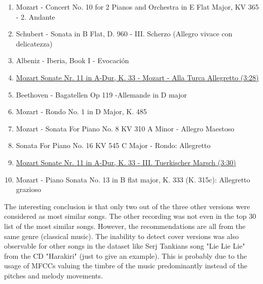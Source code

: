 \begin{enumerate}
	\setlength\itemsep{-0.5em}
	\item Mozart - Concert No. 10 for 2 Pianos and Orchestra in E Flat Major, KV 365 - 2. Andante
	\item Schubert - Sonata in B Flat, D. 960 - III. Scherzo (Allegro vivace con delicatezza)
	\item Albeniz - Iberia, Book I - Evocaci\'on
	\item \underline{Mozart Sonate Nr. 11 in A-Dur, K. 33 - Mozart - Alla Turca Allegretto (3:28)}
	\item Beethoven - Bagatellen Op 119 -Allemande in D major
	\item Mozart - Rondo No. 1 in D Major, K. 485
	\item Mozart - Sonata For Piano No. 8 KV 310 A Minor - Allegro Maestoso
	\item Sonata For Piano No. 16 KV 545 C Major - Rondo: Allegretto
	\item \underline{Mozart Sonate Nr. 11 in A-Dur, K. 33 - III. Tuerkischer Marsch (3:30)}
	\item Mozart - Piano Sonata No. 13 in B flat major, K. 333 (K. 315c): Allegretto grazioso
	
\end{enumerate}
\noindent The interesting conclusion is that only two out of the three other versions were considered as most similar songs. The other recording was not even in the top 30 list of the most similar songs. However, the recommendations are all from the same genre (classical music). The inability to detect cover versions was also observable for other songs in the dataset like Serj Tankians song "Lie Lie Lie" from the CD "Harakiri" (just to give an example). This is probably due to the usage of MFCCs valuing the timbre of the music predominantly instead of the pitches and melody movements. 

